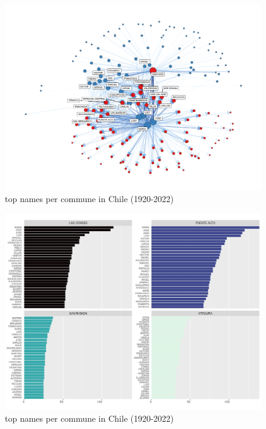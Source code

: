 \begin{figure}[H]
    \centering
    \includegraphics[width=13cm]{plot/names_commune_network.png}
    \caption{top names per commune in Chile (1920-2022)}
    \label{}
\end{figure}


\begin{figure}[H]
    \centering
    \includegraphics[width=13cm]{plot/top_nombre_comuna1.png}
    \caption{top names per commune in Chile (1920-2022)}
    \label{}
\end{figure}


